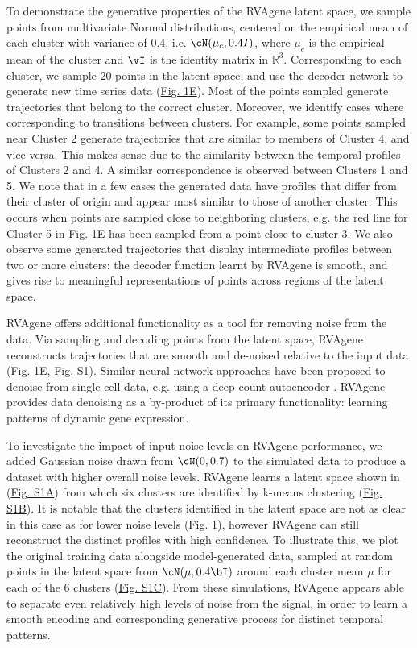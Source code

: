 To demonstrate the generative properties of the RVAgene latent space, we sample points from multivariate Normal distributions, centered on the empirical mean of each cluster with variance of 0.4, i.e. $\cN(\mu_c, 0.4I)$, where $\mu_c$ is the empirical mean of the cluster and $\vI$ is the identity matrix in $\mathbb{R}^3$. Corresponding to each cluster, we sample 20 points in the latent space, and use the decoder network to generate new time series data (\hyperref[fig:fig2]{Fig. 1E}). Most of the points sampled generate trajectories that belong to the correct cluster. Moreover, we identify cases where  corresponding to transitions between clusters. For example, some points sampled near Cluster 2 generate trajectories that are similar to members of Cluster 4, and vice versa. This makes sense due to the similarity between the temporal profiles of Clusters 2 and 4. A similar correspondence is observed between Clusters 1 and 5.
{We note that in a few cases the generated data have profiles that differ from their cluster of origin and appear most similar to those of another cluster. This occurs when points are sampled close to neighboring clusters, e.g. the red line for Cluster 5 in \hyperref[fig:fig2]{Fig. 1E} has been sampled from a point close to cluster 3.}
We also observe some generated trajectories that display intermediate profiles between two or more clusters: the decoder function learnt by RVAgene is smooth, and gives rise to meaningful representations of points across regions of the latent space. 
\par
RVAgene offers additional functionality as a tool for removing noise from the data. Via sampling and decoding points from the latent space, RVAgene reconstructs trajectories that are smooth and de-noised relative to the input data (\hyperref[fig:fig2]{Fig. 1E}, \hyperref[supp]{Fig. S1}). Similar neural network approaches have been proposed to denoise from single-cell data, e.g. using a deep count autoencoder \citep{eraslan2019single}. RVAgene provides data denoising as a by-product of its primary functionality: learning patterns of dynamic gene expression.
\par
{To investigate the impact of input noise levels on RVAgene performance, we added Gaussian noise drawn from $\cN(0,0.7)$ to the simulated data to produce a dataset with higher overall noise levels. RVAgene learns a latent space shown in (\hyperref[supp]{Fig. S1A}) from which six clusters are identified by k-means clustering (\hyperref[supp]{Fig. S1B}). It is notable that the clusters identified in the latent space are not as clear in this case as for lower noise levels (\hyperref[fig:fig2]{Fig. 1}), however RVAgene can still reconstruct the distinct profiles with high confidence. To illustrate this, we plot the original training data alongside model-generated data, sampled at random points in the latent space from  $\cN(\mu,0.4\bI)$ around each cluster mean $\mu$ for each of the 6 clusters (\hyperref[supp]{Fig. S1C}). From these simulations, RVAgene appears able to separate even relatively high levels of noise from the signal, in order to learn a smooth encoding and corresponding generative process for distinct temporal patterns.}


